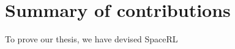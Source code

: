 







\section{Summary of contributions}\label{sec:intro-summary}

To prove our thesis, we have devised SpaceRL %

    

    
